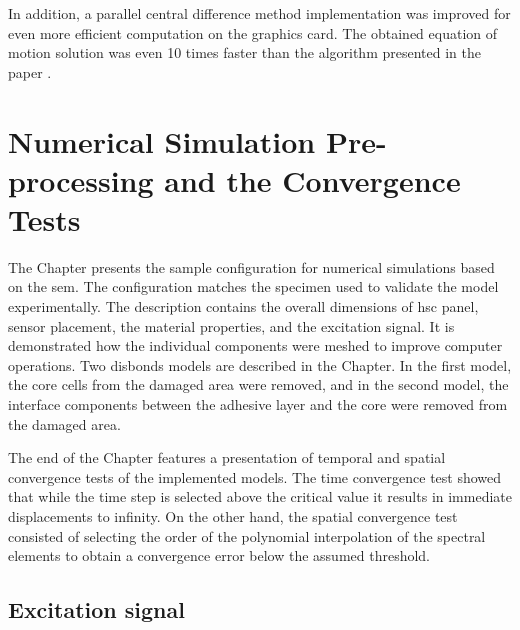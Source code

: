 \documentclass[11pt,a4paper,final]{report}
\theoremstyle{plain}
\begin{document}
In addition, a parallel central difference method implementation was improved for even more efficient computation on the graphics card.
The obtained equation of motion solution was even 10 times faster than the algorithm presented in the paper \cite{kudela2020parallel}.

\clearpage{}
\clearpage{}

\chapter{Numerical Simulation Pre-processing and the Convergence Tests}
\label{ch:simulation}

The Chapter presents the sample configuration for numerical simulations based on the \ac{sem}.
The configuration matches the specimen used to validate the model experimentally.
The description contains the overall dimensions of \ac{hsc} panel, sensor placement, the material properties, and the excitation signal.
It is demonstrated how the individual components were meshed to improve computer operations.
Two disbonds models are described in the Chapter.
In the first model, the core cells from the damaged area were removed, and in the second model, the interface components between the adhesive layer and the core were removed from the damaged area.

The end of the Chapter features a presentation of temporal and spatial convergence tests of the implemented models.
The time convergence test showed that while the time step is selected above the critical value it results in immediate displacements to infinity.
On the other hand, the spatial convergence test consisted of selecting the order of the polynomial interpolation of the spectral elements to obtain a convergence error below the assumed threshold.


\section{Excitation signal}
\label{sec:excitation}
\end{document}
